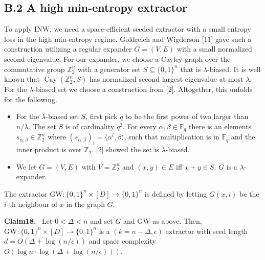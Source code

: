 \documentclass[10pt,a4paper]{article}
\newenvironment{authorclaim}[1]{\par\medskip\noindent\textbf{#1.}\ }{\par\medskip}
\begin{document}
\subsection*{B.2 A high min-entropy extractor}
To apply INW, we need a space-efficient seeded extractor with a small entropy loss in the high min-entropy regime. Goldreich and Wigderson [11] gave such a construction utilizing a regular expander $G=(V,E)$ with a small normalized second eigenvalue. For our expander, we choose a Cayley graph over the commutative group $\mathbb Z_2^n$ with a generator set $S\subseteq\{0,1\}^n$ that is $\lambda$-biased. It is well known that $\operatorname{Cay}(\mathbb Z_2^n,S)$ has normalized second largest eigenvalue at most $\lambda$. For the $\lambda$-biased set we choose a construction from [2]. Altogether, this unfolds for the following.
\begin{itemize}
\item For the $\lambda$-biased set $S$, first pick $q$ to be the first power of two larger than $n/\lambda$. The set $S$ is of cardinality $q^2$. For every $\alpha,\beta\in\mathbb F_q$ there is an elements $s_{\alpha,\beta}\in\mathbb Z_2^n$ where $(s_{\alpha,\beta})_i=\langle\alpha^i,\beta\rangle$, such that multiplication is in $\mathbb F_q$ and the inner product is over $\mathbb Z_2$. [2] showed the set is $\lambda$-biased.
\item We let $G=(V,E)$ with $V=\mathbb Z_2^n$ and $(x,y)\in E$ iff $x+y\in S$. $G$ is a $\lambda$-expander.
\end{itemize}
The extractor $\mathrm{GW}:\{0,1\}^n\times[D]\to\{0,1\}^n$ is defined by letting $G(x,i)$ be the $i$-th neighbour of $x$ in the graph $G$.
\begin{authorclaim}{Claim18}
Let $0<\Delta<n$ and set $G$ and GW as above. Then, $\mathrm{GW}:\{0,1\}^n\times[D]\to\{0,1\}^n$ is a $(k=n-\Delta,\epsilon)$ extractor with seed length $d=O(\Delta+\log(n/\epsilon))$ and space complexity $O(\log n\cdot\log(\Delta+\log(n/\epsilon)))$.
\end{authorclaim}
\end{document}
